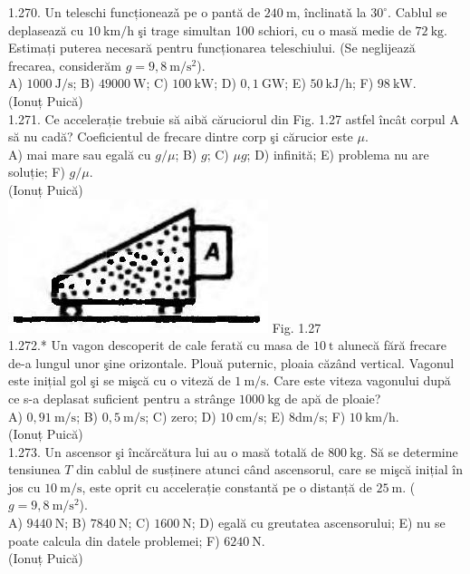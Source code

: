 1.270. Un teleschi funcționeazǎ pe o pantă de $240 \mathrm{~m}$, înclinatǎ la $30^{\circ}$. Cablul se deplasează cu $10 \mathrm{~km} / \mathrm{h}$ şi trage simultan 100 schiori, cu o masă medie de $72 \mathrm{~kg}$. Estimați puterea necesară pentru funcționarea teleschiului. (Se neglijează frecarea, considerăm $g=9,8 \mathrm{~m} / \mathrm{s}^{2}$).\\ A) $1000 \mathrm{~J} / \mathrm{s}$; B) $49000 \mathrm{~W}$; C) $100 \mathrm{~kW}$; D) $0,1 \mathrm{~GW}$; E) $50 \mathrm{~kJ} / \mathrm{h}$; F) $98 \mathrm{~kW}$.\\ (Ionuț Puică)\\

1.271. Ce accelerație trebuie să aibă căruciorul din Fig. 1.27 astfel încât corpul A să nu cadă? Coeficientul de frecare dintre corp şi cărucior este $\mu$.\\ A) mai mare sau egală cu $g / \mu$; B) $g$; C) $\mu g$; D) infinită; E) problema nu are soluție; F) $g / \mu$.\\ (Ionuț Puică)\\ \includegraphics[width=0.4\linewidth]{images/2025_07_01_5b3ff9fa0d508c8e9f17g-061} Fig. 1.27\\

1.272.* Un vagon descoperit de cale ferată cu masa de $10 \mathrm{~t}$ alunecă fără frecare de-a lungul unor şine orizontale. Plouă puternic, ploaia căzând vertical. Vagonul este inițial gol şi se mişcă cu o viteză de $1 \mathrm{~m} / \mathrm{s}$. Care este viteza vagonului după ce s-a deplasat suficient pentru a strânge $1000 \mathrm{~kg}$ de apă de ploaie?\\ A) $0,91 \mathrm{~m} / \mathrm{s}$; B) $0,5 \mathrm{~m} / \mathrm{s}$; C) zero; D) $10 \mathrm{~cm} / \mathrm{s}$; E) $8 \mathrm{dm} / \mathrm{s}$; F) $10 \mathrm{~km} / \mathrm{h}$.\\ (Ionuț Puică)\\

1.273. Un ascensor şi încărcătura lui au o masă totală de $800 \mathrm{~kg}$. Să se determine tensiunea $T$ din cablul de susținere atunci când ascensorul, care se mişcă inițial în jos cu $10 \mathrm{~m} / \mathrm{s}$, este oprit cu accelerație constantă pe o distanță de $25 \mathrm{~m}$. ($g=9,8 \mathrm{~m} / \mathrm{s}^{2}$).\\ A) $9440 \mathrm{~N}$; B) $7840 \mathrm{~N}$; C) $1600 \mathrm{~N}$; D) egală cu greutatea ascensorului; E) nu se poate calcula din datele problemei; F) $6240 \mathrm{~N}$.\\ (Ionuț Puică)\\

